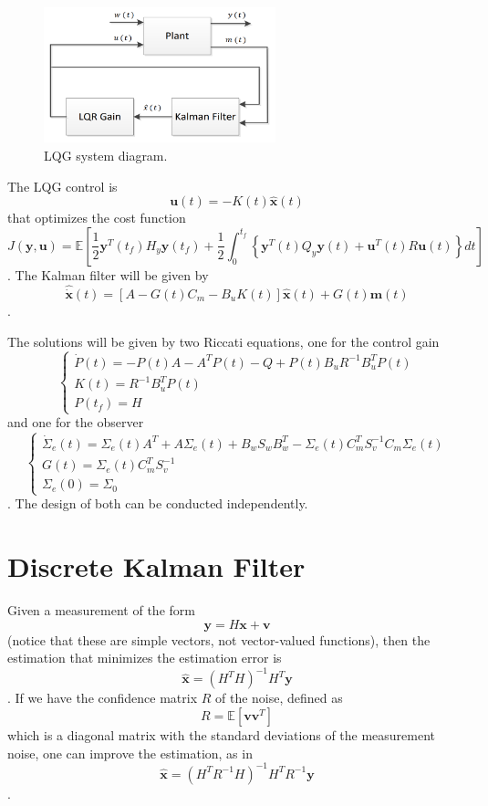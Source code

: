 \documentclass[a4paper]{report}
\begin{document}
\begin{figure}[H]
    \centering
    \includegraphics[width=0.6\textwidth]{LQG_control.png}
    \caption{LQG system diagram.}
    \label{fig:LQG_control-png}
\end{figure}

The LQG control is \[
\bm{u}(t) = -K(t)\bm{\hat{x}}(t)
\] that optimizes the cost function \[
J\left( \bm{y}, \bm{u} \right) = \mathbb{E}\left[ \frac{1}{2}\bm{y}^{T}(t_f)H_y\bm{y}(t_f) + \frac{1}{2}\int_0^{t_f}\left\{ \bm{y}^{T}(t)Q_y\bm{y}(t) + \bm{u}^{T}(t)R\bm{u}(t) \right\}dt  \right] 
\]. The Kalman filter will be given by \[
\bm{\hat{\dot{x}}}(t) = \left[  A - G(t)C_m - B_uK(t) \right]\bm{\hat{x}}(t) + G(t)\bm{m}(t)
\].

The solutions will be given by two Riccati equations, one for the control gain \[
\begin{cases}
    \dot{P}(t) = -P(t)A - A^{T}P(t) - Q + P(t)B_uR^{-1}B_u^{T}P(t) \\
    K(t) = R^{-1}B_u^{T}P(t) \\
    P(t_f) = H
\end{cases}
\] and one for the observer \[
\begin{cases}
    \dot{\Sigma}_e(t) = \Sigma_e(t)A^{T} + A\Sigma_e(t) + B_wS_wB_w^{T} - \Sigma_e(t)C_m^{T}S_v^{-1}C_m\Sigma_e(t) \\
    G(t) = \Sigma_e(t)C_m^{T}S_v^{-1} \\
    \Sigma_e(0) = \Sigma_0
\end{cases}
\]. The design of both can be conducted independently.

\section*{Discrete Kalman Filter}

Given a measurement of the form \[
\bm{y} = H\bm{x} + \bm{v}
\] (notice that these are simple vectors, not vector-valued functions), then the estimation that minimizes the estimation error is \[
\bm{\hat{x}} = \left( H^{T}H \right) ^{-1}H^{T}\bm{y}
\]. If we have the confidence matrix $R$ of the noise, defined as \[
R = \mathbb{E}\left[ \bm{v}\bm{v}^{T} \right] 
\] which is a diagonal matrix with the standard deviations of the measurement noise, one can improve the estimation, as in \[
\bm{\hat{x}} = \left( H^{T}R^{-1}H \right) ^{-1}H^{T}R^{-1}\bm{y}
\].
\end{document}
